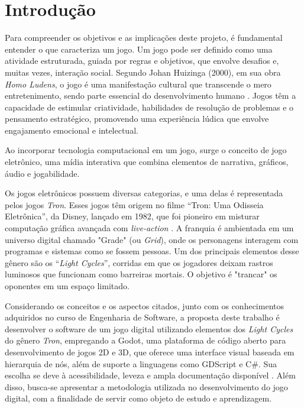 \chapter*[Introdução]{Introdução}

Para compreender os objetivos e as implicações deste projeto, é fundamental entender o que caracteriza um jogo. Um jogo pode ser definido como uma atividade estruturada, guiada por regras e objetivos, que envolve desafios e, muitas vezes, interação social. Segundo Johan Huizinga (2000), em sua obra \textit{Homo Ludens}, o jogo é uma manifestação cultural que transcende o mero entretenimento, sendo parte essencial do desenvolvimento humano \cite{huizinga2000}. Jogos têm a capacidade de estimular criatividade, habilidades de resolução de problemas e o pensamento estratégico, promovendo uma experiência lúdica que envolve engajamento emocional e intelectual.

Ao incorporar tecnologia computacional em um jogo, surge o conceito de jogo eletrônico, uma mídia interativa que combina elementos de narrativa, gráficos, áudio e jogabilidade.

Os jogos eletrônicos possuem diversas categorias, e uma delas é representada pelos jogos \textit{Tron}. Esses jogos têm origem no filme “Tron: Uma Odisseia Eletrônica”, da Disney, lançado em 1982, que foi pioneiro em misturar computação gráfica avançada com \textit{live-action} \cite{lawrence2002}. A franquia é ambientada em um universo digital chamado "Grade" (ou \textit{Grid}), onde os personagens interagem com programas e sistemas como se fossem pessoas. Um dos principais elementos desse gênero são os “\textit{Light Cycles}”, corridas em que os jogadores deixam rastros luminosos que funcionam como barreiras mortais. O objetivo é "trancar" os oponentes em um espaço limitado.

Considerando os conceitos e os aspectos citados, junto com os conhecimentos adquiridos no curso de Engenharia de Software, a proposta deste trabalho é desenvolver o software de um jogo digital utilizando elementos dos \textit{Light Cycles} do gênero \textit{Tron}, empregando a Godot, uma plataforma de código aberto para desenvolvimento de jogos 2D e 3D, que oferece uma interface visual baseada em hierarquia de nós, além de suporte a linguagens como GDScript e C\#. Sua escolha se deve à acessibilidade, leveza e ampla documentação disponível \cite{godot}. Além disso, busca-se apresentar a metodologia utilizada no desenvolvimento do jogo digital, com a finalidade de servir como objeto de estudo e aprendizagem.

